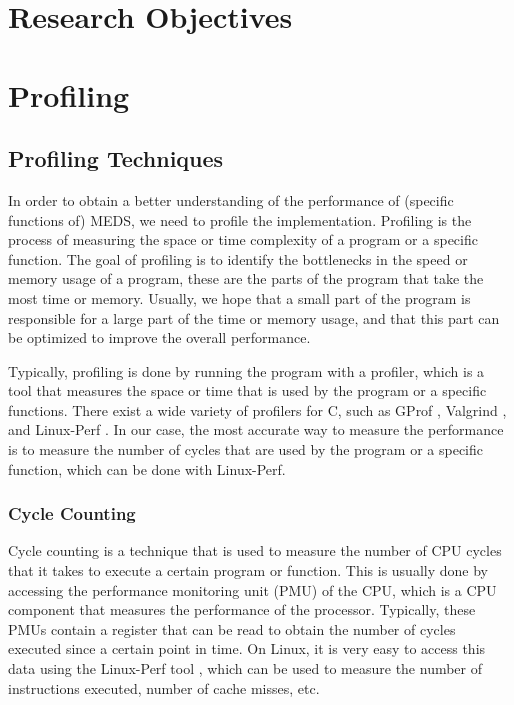 \documentclass[11pt,a4paper]{report}
\theoremstyle{definition}
\begin{document}
\chapter{Research Objectives}
\label{ch:researchobjectives}

\chapter{Profiling}
\label{ch:profiling}
\section{Profiling Techniques}
In order to obtain a better understanding of the performance of (specific functions of) MEDS, we need to profile the implementation. Profiling is the process of measuring the space or time complexity of a program or a specific function. The goal of profiling is to identify the bottlenecks in the speed or memory usage of a program, these are the parts of the program that take the most time or memory. Usually, we hope that a small part of the program is responsible for a large part of the time or memory usage, and that this part can be optimized to improve the overall performance.

Typically, profiling is done by running the program with a profiler, which is a tool that measures the space or time that is used by the program or a specific functions. There exist a wide variety of profilers for C, such as GProf \cite{graham1982gprof}, Valgrind \cite{nethercote2007valgrind}, and Linux-Perf \cite{de2010new}. In our case, the most accurate way to measure the performance is to measure the number of cycles that are used by the program or a specific function, which can be done with Linux-Perf.

\subsection{Cycle Counting}
Cycle counting is a technique that is used to measure the number of CPU cycles that it takes to execute a certain program or function. This is usually done by accessing the performance monitoring unit (PMU) of the CPU, which is a CPU component that measures the performance of the processor. Typically, these PMUs contain a register that can be read to obtain the number of cycles executed since a certain point in time. On Linux, it is very easy to access this data using the Linux-Perf tool \cite{de2010new}, which can be used to measure the number of instructions executed, number of cache misses, etc.
\end{document}
